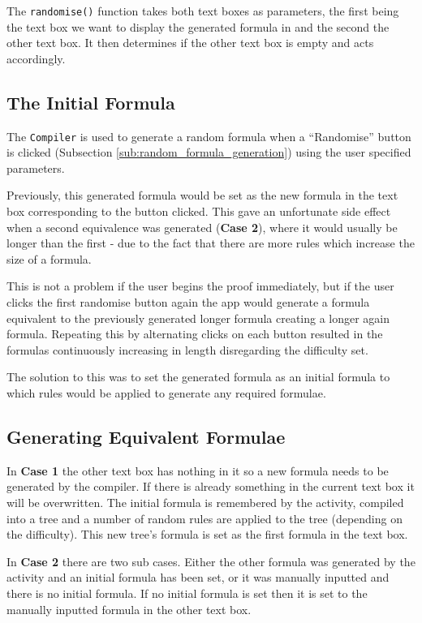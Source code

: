 \documentclass{report}
\begin{document}
The {\tt randomise()} function takes both text boxes as parameters, the first being the text box we want to display the generated formula in and the second the other text box. It then determines if the other text box is empty and acts accordingly.

\subsection{The Initial Formula}

The {\tt Compiler} is used to generate a random formula when a ``Randomise'' button is clicked (Subsection \ref{sub:random_formula_generation}) using the user specified parameters.

Previously, this generated formula would be set as the new formula in the text box corresponding to the button clicked. This gave an unfortunate side effect when a second equivalence was generated (\textbf{Case 2}), where it would usually be longer than the first - due to the fact that there are more rules which increase the size of a formula. 

This is not a problem if the user begins the proof immediately, but if the user clicks the first randomise button again the app would generate a formula equivalent to the previously generated longer formula creating a longer again formula. Repeating this by alternating clicks on each button resulted in the formulas continuously increasing in length disregarding the difficulty set.

The solution to this was to set the generated formula as an initial formula to which rules would be applied to generate any required formulae.

\subsection{Generating Equivalent Formulae}

In \textbf{Case 1} the other text box has nothing in it so a new formula needs to be generated by the compiler. If there is already something in the current text box it will be overwritten. The initial formula is remembered by the activity, compiled into a tree and a number of random rules are applied to the tree (depending on the difficulty). This new tree's formula is set as the first formula in the text box.

In \textbf{Case 2} there are two sub cases. Either the other formula was generated by the activity and an initial formula has been set, or it was manually inputted and there is no initial formula. If no initial formula is set then it is set to the manually inputted formula in the other text box.
\end{document}
